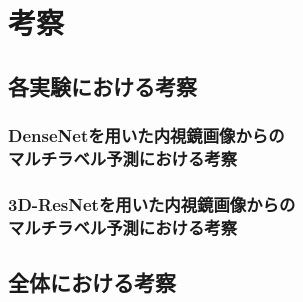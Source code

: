 \section{考察}
\subsection{各実験における考察}
\subsubsection{DenseNetを用いた内視鏡画像からの\\マルチラベル予測における考察}
\subsubsection{3D-ResNetを用いた内視鏡画像からの\\マルチラベル予測における考察}
\subsection{全体における考察}
